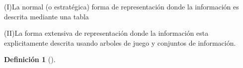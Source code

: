 \documentclass[a4paper]{report} %
\newtheorem{definicion}{Definición}[section]
\begin{document}
(I)La normal (o estratégica) forma de representación donde la información es descrita mediante una tabla


(II)La forma extensiva de representación donde la información esta explicitamente descrita usando arboles de juego y conjuntos de información.

\begin{definicion}[]

\end{definicion}




\newpage

\end{document}
